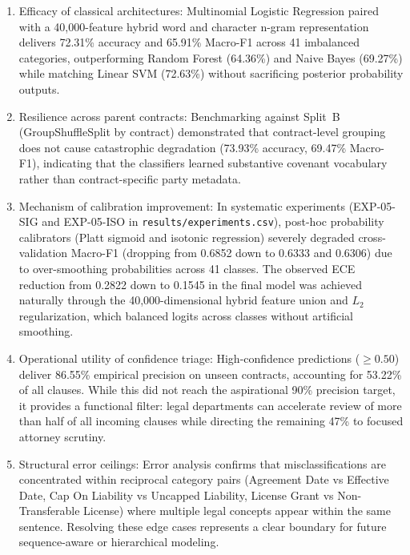 \begin{enumerate}
    \item Efficacy of classical architectures: Multinomial Logistic Regression paired with a 40,000-feature hybrid word and character n-gram representation delivers 72.31\% accuracy and 65.91\% Macro-F1 across 41 imbalanced categories, outperforming Random Forest (64.36\%) and Naive Bayes (69.27\%) while matching Linear SVM (72.63\%) without sacrificing posterior probability outputs.
    \item Resilience across parent contracts: Benchmarking against Split~B (GroupShuffleSplit by contract) demonstrated that contract-level grouping does not cause catastrophic degradation (73.93\% accuracy, 69.47\% Macro-F1), indicating that the classifiers learned substantive covenant vocabulary rather than contract-specific party metadata.
    \item Mechanism of calibration improvement: In systematic experiments (EXP-05-SIG and EXP-05-ISO in \texttt{results/experiments.csv}), post-hoc probability calibrators (Platt sigmoid and isotonic regression) severely degraded cross-validation Macro-F1 (dropping from 0.6852 down to 0.6333 and 0.6306) due to over-smoothing probabilities across 41 classes. The observed ECE reduction from 0.2822 down to 0.1545 in the final model was achieved naturally through the 40,000-dimensional hybrid feature union and $L_2$ regularization, which balanced logits across classes without artificial smoothing.
    \item Operational utility of confidence triage: High-confidence predictions ($\ge 0.50$) deliver 86.55\% empirical precision on unseen contracts, accounting for 53.22\% of all clauses. While this did not reach the aspirational 90\% precision target, it provides a functional filter: legal departments can accelerate review of more than half of all incoming clauses while directing the remaining 47\% to focused attorney scrutiny.
    \item Structural error ceilings: Error analysis confirms that misclassifications are concentrated within reciprocal category pairs (Agreement Date vs Effective Date, Cap On Liability vs Uncapped Liability, License Grant vs Non-Transferable License) where multiple legal concepts appear within the same sentence. Resolving these edge cases represents a clear boundary for future sequence-aware or hierarchical modeling.
\end{enumerate}
